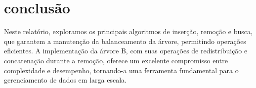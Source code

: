 \section{conclusão}

Neste relatório, exploramos os principais algoritmos de inserção, remoção e busca, 
que garantem a manutenção da balanceamento da árvore, permitindo operações eficientes. 
A implementação da árvore B, com suas operações de redistribuição e concatenação durante a 
remoção, oferece um excelente compromisso entre complexidade e desempenho, tornando-a uma 
ferramenta fundamental para o gerenciamento de dados em larga escala.